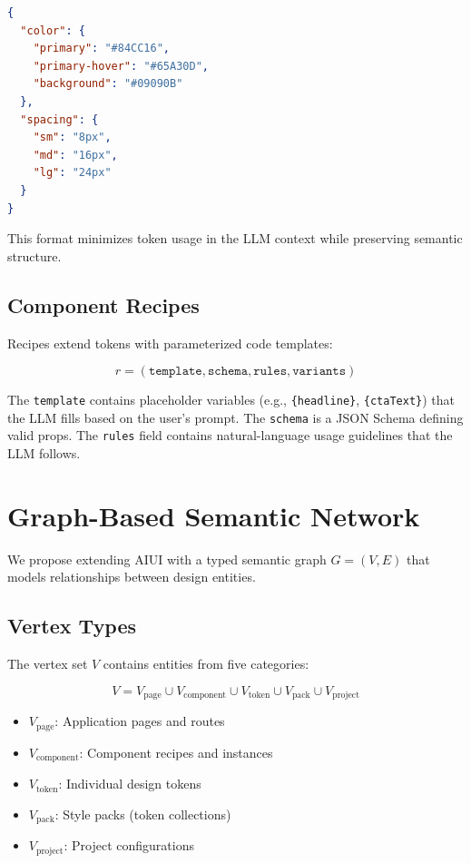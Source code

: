 \documentclass[11pt,twocolumn]{article}
\begin{document}
\begin{lstlisting}[language=json,caption={Token response format}]
{
  "color": {
    "primary": "#84CC16",
    "primary-hover": "#65A30D",
    "background": "#09090B"
  },
  "spacing": {
    "sm": "8px",
    "md": "16px",
    "lg": "24px"
  }
}
\end{lstlisting}

This format minimizes token usage in the LLM context while preserving semantic structure.

\subsection{Component Recipes}
Recipes extend tokens with parameterized code templates:

\begin{equation}
  r = (\texttt{template}, \texttt{schema}, \texttt{rules}, \texttt{variants})
\end{equation}

The \texttt{template} contains placeholder variables (e.g., \texttt{\{headline\}}, \texttt{\{ctaText\}}) that the LLM fills based on the user's prompt. The \texttt{schema} is a JSON Schema defining valid props. The \texttt{rules} field contains natural-language usage guidelines that the LLM follows.

\section{Graph-Based Semantic Network}

We propose extending AIUI with a typed semantic graph $G = (V, E)$ that models relationships between design entities.

\subsection{Vertex Types}
The vertex set $V$ contains entities from five categories:

\begin{equation}
  V = V_{\text{page}} \cup V_{\text{component}} \cup V_{\text{token}} \cup V_{\text{pack}} \cup V_{\text{project}}
\end{equation}

\begin{itemize}[nosep]
  \item $V_{\text{page}}$: Application pages and routes
  \item $V_{\text{component}}$: Component recipes and instances
  \item $V_{\text{token}}$: Individual design tokens
  \item $V_{\text{pack}}$: Style packs (token collections)
  \item $V_{\text{project}}$: Project configurations
\end{itemize}
\end{document}
